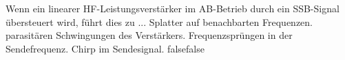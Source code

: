     {Wenn ein linearer HF-Leistungsverstärker im AB-Betrieb durch ein SSB-Signal übersteuert wird, führt dies zu ...}
    {Splatter auf benachbarten Frequenzen.}
    {parasitären Schwingungen des Verstärkers.}
    {Frequenzsprüngen in der Sendefrequenz.}
    {Chirp im Sendesignal.}
    {false}{false}